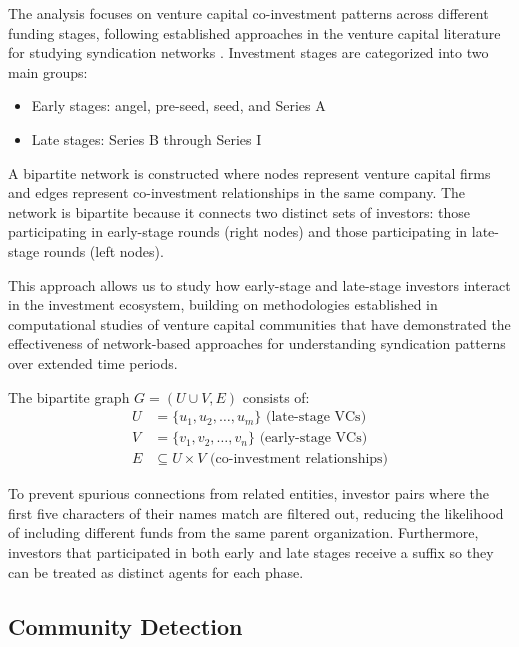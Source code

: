 The analysis focuses on venture capital co-investment patterns across different funding stages, following established approaches in the venture capital literature for studying syndication networks \cite{Bubna2020}. Investment stages are categorized into two main groups:
\begin{itemize}
    \item Early stages: angel, pre-seed, seed, and Series A
    \item Late stages: Series B through Series I
\end{itemize}

A bipartite network is constructed where nodes represent venture capital firms and edges represent co-investment relationships in the same company. The network is bipartite because it connects two distinct sets of investors: those participating in early-stage rounds (right nodes) and those participating in late-stage rounds (left nodes).

This approach allows us to study how early-stage and late-stage investors interact in the investment ecosystem, building on methodologies established in computational studies of venture capital communities that have demonstrated the effectiveness of network-based approaches for understanding syndication patterns over extended time periods.

The bipartite graph $G = (U \cup V, E)$ consists of:
\begin{align}
U &= \{u_1, u_2, \ldots, u_m\} \text{ (late-stage VCs)} \\
V &= \{v_1, v_2, \ldots, v_n\} \text{ (early-stage VCs)} \\
E &\subseteq U \times V \text{ (co-investment relationships)}
\end{align}

To prevent spurious connections from related entities, investor pairs where the first five characters of their names match are filtered out, reducing the likelihood of including different funds from the same parent organization. Furthermore, investors that participated in both early and late stages receive a suffix so they can be treated as distinct agents for each phase.


\subsection{Community Detection}

